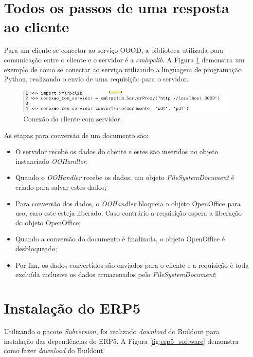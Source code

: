 \section{Todos os passos de uma resposta ao cliente}

Para um cliente se conectar ao serviço OOOD, a biblioteca utilizada para comunicação entre o cliente e o servidor é a \textit{xmlrpclib}. A Figura \ref{fig:xmlrpclib.png} demonstra um exemplo de como se conectar ao serviço utilizando a linguagem de programação Python, realizando o envio de uma requisição para o servidor.

\begin{figure}[!ht]
\centering
\begin{center}
\includegraphics[scale=0.660,bb=0 0 600 50]{cliente.png}
\end{center}
\caption{Conexão do cliente com servidor.}
\label{fig:xmlrpclib.png}
\end{figure}

As etapas para conversão de um documento são:
\begin{itemize}
\item O servidor recebe os dados do cliente e estes são inseridos no objeto instanciado \textit{OOHandler};
\item Quando o \textit{OOHandler} recebe os dados, um objeto \textit{FileSystemDocument} é criado para salvar estes dados;
\item Para conversão dos dados, o \textit{OOHandler} bloqueia o objeto OpenOffice para uso, caso este esteja liberado. Caso contrário a requisição espera a liberação do objeto OpenOffice;
\item Quando a conversão do documento é finalizada, o objeto OpenOffice é desbloqueado;
\item Por fim, os dados convertidos são enviados para o cliente e a requisição é toda excluída inclusive os dados armazenados pelo \textit{FileSystemDocument};
\end{itemize}

\section{Instalação do ERP5}
Utilizando o pacote \textit{Subversion}, foi realizado \textit{download} do Buildout para instalação das dependências do ERP5. A Figura \ref{fig:erp5_software} demonstra como fazer \textit{download} do Buildout.

